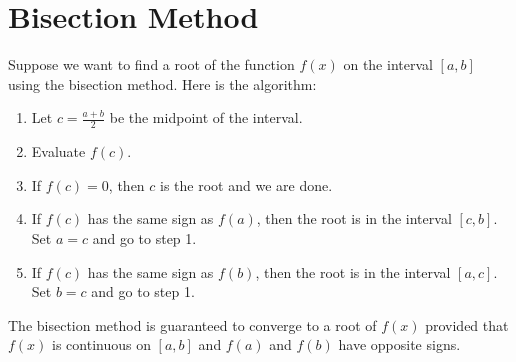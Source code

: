 \documentclass{article}
\begin{document}
\section{Bisection Method}

Suppose we want to find a root of the function $f(x)$ on the interval $[a,b]$ using the bisection method. Here is the algorithm:

\begin{enumerate}
\item Let $c = \frac{a+b}{2}$ be the midpoint of the interval.
\item Evaluate $f(c)$.
\item If $f(c) = 0$, then $c$ is the root and we are done.
\item If $f(c)$ has the same sign as $f(a)$, then the root is in the interval $[c,b]$. Set $a = c$ and go to step 1.
\item If $f(c)$ has the same sign as $f(b)$, then the root is in the interval $[a,c]$. Set $b = c$ and go to step 1.
\end{enumerate}

The bisection method is guaranteed to converge to a root of $f(x)$ provided that $f(x)$ is continuous on $[a,b]$ and $f(a)$ and $f(b)$ have opposite signs.
\end{document}
